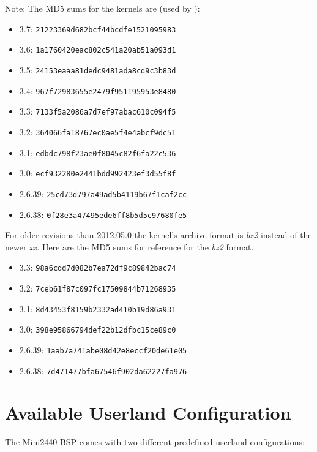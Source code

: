 Note: The MD5 sums for the kernels are (used by \ptxdist{}):
\begin{itemize}
	\item 3.7: \texttt{21223369d682bcf44bcdfe1521095983}
	\item 3.6: \texttt{1a1760420eac802c541a20ab51a093d1}
	\item 3.5: \texttt{24153eaaa81dedc9481ada8cd9c3b83d}
	\item 3.4: \texttt{967f72983655e2479f951195953e8480}
	\item 3.3: \texttt{7133f5a2086a7d7ef97abac610c094f5}
	\item 3.2: \texttt{364066fa18767ec0ae5f4e4abcf9dc51}
	\item 3.1: \texttt{edbdc798f23ae0f8045c82f6fa22c536}
	\item 3.0: \texttt{ecf932280e2441bdd992423ef3d55f8f}
	\item 2.6.39: \texttt{25cd73d797a49ad5b4119b67f1caf2cc}
	\item 2.6.38: \texttt{0f28e3a47495ede6ff8b5d5c97680fe5}
\end{itemize}

For older \ptxdist{} revisions than 2012.05.0 the kernel's archive format
is \textit{bz2} instead of the newer \textit{xz}. Here are the MD5 sums
for reference for the \textit{bz2} format.

\begin{itemize}
	\item 3.3: \texttt{98a6cdd7d082b7ea72df9c89842bac74}
	\item 3.2: \texttt{7ceb61f87c097fc17509844b71268935}
	\item 3.1: \texttt{8d43453f8159b2332ad410b19d86a931}
	\item 3.0: \texttt{398e95866794def22b12dfbc15ce89c0}
	\item 2.6.39: \texttt{1aab7a741abe08d42e8eccf20de61e05}
	\item 2.6.38: \texttt{7d471477bfa67546f902da62227fa976}
\end{itemize}


\section{Available Userland Configuration}	\label{sec:userland}

The Mini2440 BSP comes with two different predefined userland configurations:

